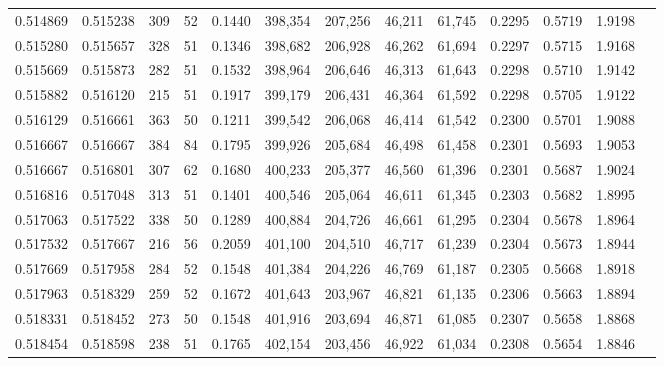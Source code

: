 \begin{tabular}{rrrrrrrrrrrrr}
0.514869 & 0.515238 &    309 &    52 &                                     0.1440 & 398,354 & 207,256 &  46,211 &  61,745 & 0.2295 & 0.5719 & 1.9198 \\
0.515280 & 0.515657 &    328 &    51 &                                     0.1346 & 398,682 & 206,928 &  46,262 &  61,694 & 0.2297 & 0.5715 & 1.9168 \\
0.515669 & 0.515873 &    282 &    51 &                                     0.1532 & 398,964 & 206,646 &  46,313 &  61,643 & 0.2298 & 0.5710 & 1.9142 \\
0.515882 & 0.516120 &    215 &    51 &                                     0.1917 & 399,179 & 206,431 &  46,364 &  61,592 & 0.2298 & 0.5705 & 1.9122 \\
0.516129 & 0.516661 &    363 &    50 &                                     0.1211 & 399,542 & 206,068 &  46,414 &  61,542 & 0.2300 & 0.5701 & 1.9088 \\
0.516667 & 0.516667 &    384 &    84 &                                     0.1795 & 399,926 & 205,684 &  46,498 &  61,458 & 0.2301 & 0.5693 & 1.9053 \\
0.516667 & 0.516801 &    307 &    62 &                                     0.1680 & 400,233 & 205,377 &  46,560 &  61,396 & 0.2301 & 0.5687 & 1.9024 \\
0.516816 & 0.517048 &    313 &    51 &                                     0.1401 & 400,546 & 205,064 &  46,611 &  61,345 & 0.2303 & 0.5682 & 1.8995 \\
0.517063 & 0.517522 &    338 &    50 &                                     0.1289 & 400,884 & 204,726 &  46,661 &  61,295 & 0.2304 & 0.5678 & 1.8964 \\
0.517532 & 0.517667 &    216 &    56 &                                     0.2059 & 401,100 & 204,510 &  46,717 &  61,239 & 0.2304 & 0.5673 & 1.8944 \\
0.517669 & 0.517958 &    284 &    52 &                                     0.1548 & 401,384 & 204,226 &  46,769 &  61,187 & 0.2305 & 0.5668 & 1.8918 \\
0.517963 & 0.518329 &    259 &    52 &                                     0.1672 & 401,643 & 203,967 &  46,821 &  61,135 & 0.2306 & 0.5663 & 1.8894 \\
0.518331 & 0.518452 &    273 &    50 &                                     0.1548 & 401,916 & 203,694 &  46,871 &  61,085 & 0.2307 & 0.5658 & 1.8868 \\
0.518454 & 0.518598 &    238 &    51 &                                     0.1765 & 402,154 & 203,456 &  46,922 &  61,034 & 0.2308 & 0.5654 & 1.8846 \\

\end{tabular}
